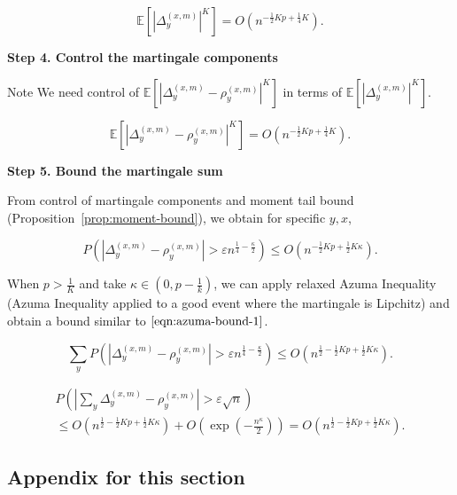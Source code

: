 \[
	\mathbb{E}\left[ \left| \Delta_y^{(x,m)}\right|^K  \right]
		= O\left(n^{-\frac{1}{2}Kp + \frac{1}{4}K}\right)
.\] 

\textbf{Step 4. Control the martingale components}

\begin{note}{Note}
	We need control of $\mathbb{E}\left[  \left| \Delta_y^{(x,m)} - \rho_y^{(x,m)} \right| ^K\right] $ in terms of $\mathbb{E}\left[ \left| \Delta_y^{(x,m)} \right| ^K \right] $.
	
\end{note}
\[
	\mathbb{E}\left[ \left| \Delta_y^{(x,m)} - \rho_y^{(x,m)}\right|^K  \right]
		= O\left(n^{-\frac{1}{2}Kp + \frac{1}{4}K}\right)
.\]

\textbf{Step 5. Bound the martingale sum}

From control of martingale components and moment tail bound (Proposition~\ref{prop:moment-bound}), we obtain for specific $y, x$,

\[
	P\left( \left| \Delta_y^{(x,m)} - \rho_y^{(x,m)}\right| > \varepsilon n^{\frac{1}{4} - \frac{\kappa}{2}}   \right) \le O\left( n^{-\frac{1}{2} K p + \frac{1}{2} K \kappa} \right) 
.\] 



When $p > \frac{1}{K}$ and take $\kappa \in (0,p - \frac{1}{k})$, we can apply relaxed Azuma Inequality (Azuma Inequality applied to a good event where the martingale is Lipchitz) and obtain a bound similar to $\ref{eqn:azuma-bound-1}$.

\[
	\sum_y P\left( \left| \Delta_y^{(x,m)} - \rho_y^{(x,m)}\right| > \varepsilon n^{\frac{1}{4} - \frac{\kappa}{2}}   \right) 
	\le O\left( n^{\frac{1}{2}-\frac{1}{2} K p + \frac{1}{2} K \kappa} \right) 
.\]

 \begin{multline}
	P \left( \left| \sum_y \Delta_y^{(x,m)} - \rho_y^{(x,m)} \right| > \varepsilon \sqrt{n} \right) \\
	\le O\left( n^{\frac{1}{2}-\frac{1}{2}K p + \frac{1}{2} K \kappa } \right) + O\left( \exp\left( -\frac{ n^{\kappa}}{2}  \right)  \right) 
	= O\left( n^{\frac{1}{2}-\frac{1}{2}K p + \frac{1}{2} K \kappa } \right)
.\end{multline} 



\newpage

\subsection{Appendix for this section}

